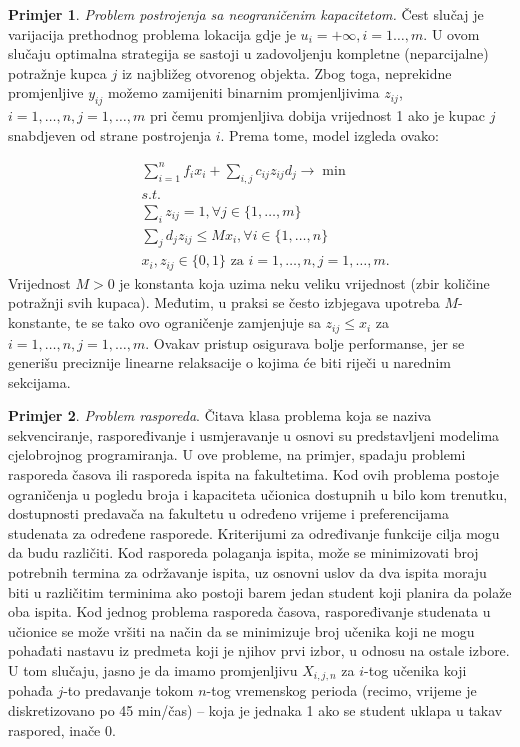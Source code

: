 \documentclass[a4paper, utf8, 11pt, colorlinks]{book}
\theoremstyle{definition}
\newtheorem{primjer}{Primjer}[chapter]
\begin{document}
\begin{primjer}
	
\emph{Problem postrojenja sa neograničenim kapacitetom.}
Čest slučaj je varijacija prethodnog problema lokacija gdje je $ u_{i} = + \infty,i=1\ldots,m$. U ovom slučaju optimalna strategija se sastoji u zadovoljenju kompletne (neparcijalne) potražnje kupca $j$ iz najbližeg otvorenog objekta. Zbog toga, neprekidne promjenljive  $y_{ij}$ možemo zamijeniti binarnim promjenljivima $z_{ij}$, $i=1,\ldots,n, j=1,\ldots,m$ pri čemu promjenljiva dobija vrijednost 1 ako je kupac $j$ snabdjeven od strane postrojenja $i$. Prema tome, model izgleda ovako:

\begin{align*}
	&\sum_{i=1}^n f_i x_i  + \sum_{i,j} c_{ij} z_{ij} d_j \rightarrow \min\\
	& s.t. \nonumber \\
	& \sum_{i} z_{ij} = 1, \forall j\in\{1,\ldots,m\} \\
	& \sum_{j} d_j z_{ij} \leq M x_i, \forall i \in \{1,\ldots,n\} \\
	& x_i, z_{ij} \in \{0,1\} \mbox{ za } i = 1, \ldots, n, j = 1,  \ldots, m.
\end{align*}
Vrijednost $M>0$ je konstanta koja uzima neku veliku vrijednost (zbir količine potražnji svih kupaca). Međutim, u praksi se često izbjegava upotreba $M$-konstante, te se tako ovo ograničenje zamjenjuje sa $ z_{ij} \leq x_i$ 
za $ i = 1, \ldots, n, j = 1,  \ldots, m$. Ovakav pristup osigurava bolje performanse, jer se generišu preciznije linearne relaksacije o kojima će biti riječi u narednim sekcijama.
\end{primjer}
\begin{primjer}
\emph{Problem rasporeda}. Čitava klasa problema koja se naziva sekvenciranje, raspoređivanje i usmjeravanje u osnovi su predstavljeni modelima cjelobrojnog programiranja. U ove probleme, na primjer, spadaju problemi rasporeda časova ili rasporeda ispita na fakultetima. Kod ovih problema postoje ograničenja u pogledu broja i kapaciteta učionica dostupnih u bilo kom trenutku, dostupnosti predavača na fakultetu u određeno vrijeme i preferencijama studenata za određene rasporede. Kriterijumi za određivanje funkcije cilja mogu da budu različiti. Kod rasporeda polaganja ispita, može se minimizovati broj potrebnih termina za održavanje ispita, uz osnovni uslov da dva ispita moraju biti u različitim terminima ako postoji barem jedan student koji planira da polaže oba ispita.  Kod jednog problema rasporeda časova, raspoređivanje studenata u  učionice se može vršiti na  način da se minimizuje broj učenika koji ne mogu pohađati nastavu iz predmeta koji je njihov prvi izbor, u odnosu na ostale izbore.
 U tom slučaju, jasno je da imamo promjenljivu $X_{i,j,n}$ za   $i$-tog učenika 
koji pohađa $j$-to predavanje tokom $n$-tog vremenskog perioda (recimo, vrijeme je diskretizovano po 45 min/čas) -- koja je jednaka 1 ako se student uklapa u takav raspored, inače 0. 
\end{primjer}
\end{document}
